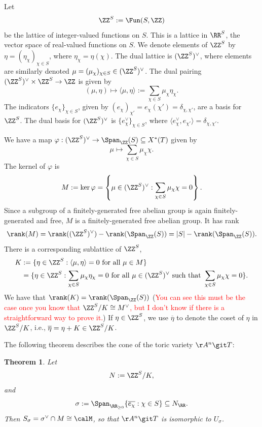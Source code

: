 \documentclass[12pt]{amsart}
\theoremstyle{plain}
\newtheorem{theorem}{Theorem}%
\begin{document}
Let 
$$\ZZ^S := \Fun(S, \ZZ)$$
be the lattice of integer-valued functions on $S$.
This is a lattice in $\RR^S$, the vector space of real-valued functions on $S$.
We denote elements of $\ZZ^S$ by $\eta = (\eta_\chi)_{\chi \in S}$, where $\eta_\chi = \eta(\chi)$.
The dual lattice is $(\ZZ^S)^\vee$, where elements are similarly denoted $\mu = (\mu_\chi)_{\chi \in S} \in (\ZZ^S)^\vee$.
The dual pairing $(\ZZ^S)^\vee \times \ZZ^S \to \ZZ$ is given by
$$(\mu, \eta) \mapsto \langle \mu, \eta \rangle := \sum_{\chi \in S} \mu_\chi \eta_\chi.$$
The indicators $\{e_\chi\}_{\chi\in S}$, given by $(e_\chi)_{\chi'} = e_\chi(\chi') = \delta_{\chi, \chi'}$, are a basis for $\ZZ^S$.
The dual basis for $(\ZZ^S)^\vee$ is $\{e_\chi^\vee\}_{\chi\in S}$, where $\langle e_\chi^\vee, e_{\chi'} \rangle = \delta_{\chi, \chi'}$.

We have a map $\varphi:(\ZZ^S)^\vee \to \Span_\ZZ(S) \subseteq X^*(T)$ given by
$$\mu \mapsto \sum_{\chi\in S} \mu_\chi \chi.$$
The kernel of $\varphi$ is
$$M := \ker \varphi = \left\{\mu \in (\ZZ^S)^\vee : \sum_{\chi \in S} \mu_\chi \chi = 0\right\}.$$
Since a subgroup of a finitely-generated free abelian group is again finitely-generated and free, $M$ is a finitely-generated free abelian group.
It has rank
$$\rank(M) = \rank((\ZZ^S)^\vee) - \rank(\Span_\ZZ(S)) = |S| - \rank(\Span_\ZZ(S)).$$
There is a corresponding sublattice of $\ZZ^S$, 
\begin{align*}
	K &:= \{\eta \in \ZZ^S : \langle \mu, \eta \rangle = 0 \text{ for all } \mu \in M\} \\
	   &= \{\eta \in \ZZ^S : \sum_{\chi \in S} \mu_\chi \eta_\chi = 0 \text{ for all } \mu \in (\ZZ^S)^\vee \text{ such that } \sum_{\chi \in S} \mu_\chi \chi = 0 \}.
\end{align*}
We have that $\rank(K) = \rank(\Span_\ZZ(S))$ (\textcolor{red}{You can see this must be the case once you know that $\ZZ^S/K \cong M^\vee$, but I don't know if there is a straightforward way to prove it.})
If $\eta \in \ZZ^S$, we use $\overline{\eta}$ to denote the coset of $\eta$ in $\ZZ^S/K$, i.e., $\overline{\eta} = \eta + K \in \ZZ^S/K$.

The following theorem describes the cone of the toric variety $\AA^n \git T$:

\begin{theorem}\label{gitlatticetheorem}
Let 
$$N := \ZZ^S / K,$$
and 
$$\sigma := \Span_{\RR_{\ge 0}} \{\overline{e_\chi} : \chi \in S\} \subseteq N_\RR.$$
Then $S_\sigma = \sigma^\vee \cap M \cong \calM$, so that $\AA^n \git T$ is isomorphic to $U_\sigma$.
\end{theorem}
\end{document}
